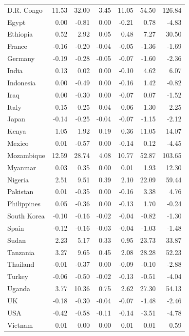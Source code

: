 \documentclass[12pt,english]{article}
\begin{document}
\begin{table}[b]
\begin{tabular}[t]{lrrrrrr}
                D.R. Congo & 11.53 & 32.00 & 3.45 & 11.05 & 54.50 & 126.84\\
                Egypt & 0.00 & -0.81 & 0.00 & -0.21 & 0.78 & -4.83\\
                Ethiopia & 0.52 & 2.92 & 0.05 & 0.48 & 7.27 & 30.50\\
                France & -0.16 & -0.20 & -0.04 & -0.05 & -1.36 & -1.69\\
                Germany & -0.19 & -0.28 & -0.05 & -0.07 & -1.60 & -2.36\\
                India & 0.13 & 0.02 & 0.00 & -0.10 & 4.62 & 6.07\\
                Indonesia & 0.00 & -0.49 & 0.00 & -0.16 & 1.42 & -0.82\\
                Iraq & 0.00 & -0.30 & 0.00 & -0.07 & 0.07 & -1.52\\
                Italy & -0.15 & -0.25 & -0.04 & -0.06 & -1.30 & -2.25\\
                Japan & -0.14 & -0.25 & -0.04 & -0.07 & -1.15 & -2.12\\
                Kenya & 1.05 & 1.92 & 0.19 & 0.36 & 11.05 & 14.07\\
                Mexico & 0.01 & -0.57 & 0.00 & -0.14 & 0.12 & -4.45\\
                Mozambique & 12.59 & 28.74 & 4.08 & 10.77 & 52.87 & 103.65\\
                Myanmar & 0.03 & 0.35 & 0.00 & 0.01 & 1.93 & 12.30\\
                Nigeria & 2.51 & 9.51 & 0.39 & 2.10 & 22.09 & 59.44\\
                Pakistan & 0.01 & -0.35 & 0.00 & -0.16 & 3.38 & 4.76\\
                Philippines & 0.05 & -0.36 & 0.00 & -0.13 & 1.70 & -0.24\\
                South Korea & -0.10 & -0.16 & -0.02 & -0.04 & -0.82 & -1.30\\
                Spain & -0.12 & -0.16 & -0.03 & -0.04 & -1.03 & -1.48\\
                Sudan & 2.23 & 5.17 & 0.33 & 0.95 & 23.73 & 33.87\\
                Tanzania & 3.27 & 9.65 & 0.45 & 2.08 & 28.28 & 52.23\\
                Thailand & -0.01 & -0.37 & 0.00 & -0.09 & -0.10 & -2.88\\
                Turkey & -0.06 & -0.50 & -0.02 & -0.13 & -0.51 & -4.04\\
                Uganda & 3.77 & 10.36 & 0.75 & 2.62 & 27.30 & 54.13\\
                UK & -0.18 & -0.30 & -0.04 & -0.07 & -1.48 & -2.46\\
                USA & -0.42 & -0.58 & -0.11 & -0.14 & -3.51 & -4.78\\
                Vietnam & -0.01 & 0.00 & 0.00 & -0.01 & -0.01 & 0.59\\
                \bottomrule
                \end{tabular}
                \end{table}
\end{document}
